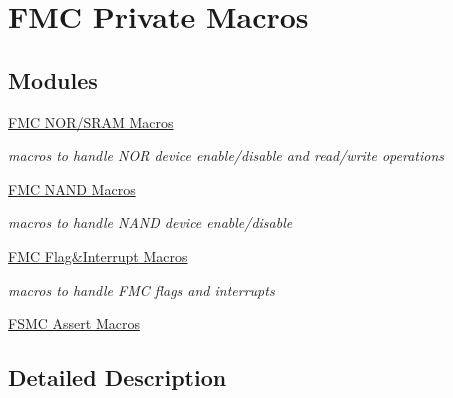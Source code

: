 \hypertarget{group___f_m_c___l_l___private___macros}{}\section{F\+MC Private Macros}
\label{group___f_m_c___l_l___private___macros}
\subsection*{Modules}
\begin{DoxyCompactItemize}
\item 
\hyperlink{group___f_m_c___l_l___n_o_r___macros}{F\+M\+C N\+O\+R/\+S\+R\+A\+M Macros}
\begin{DoxyCompactList}\small\item\em macros to handle N\+OR device enable/disable and read/write operations \end{DoxyCompactList}\item 
\hyperlink{group___f_m_c___l_l___n_a_n_d___macros}{F\+M\+C N\+A\+N\+D Macros}
\begin{DoxyCompactList}\small\item\em macros to handle N\+A\+ND device enable/disable \end{DoxyCompactList}\item 
\hyperlink{group___f_m_c___l_l___flag___interrupt___macros}{F\+M\+C Flag\&\+Interrupt Macros}
\begin{DoxyCompactList}\small\item\em macros to handle F\+MC flags and interrupts \end{DoxyCompactList}\item 
\hyperlink{group___f_s_m_c___l_l___assert___macros}{F\+S\+M\+C Assert Macros}
\end{DoxyCompactItemize}


\subsection{Detailed Description}

